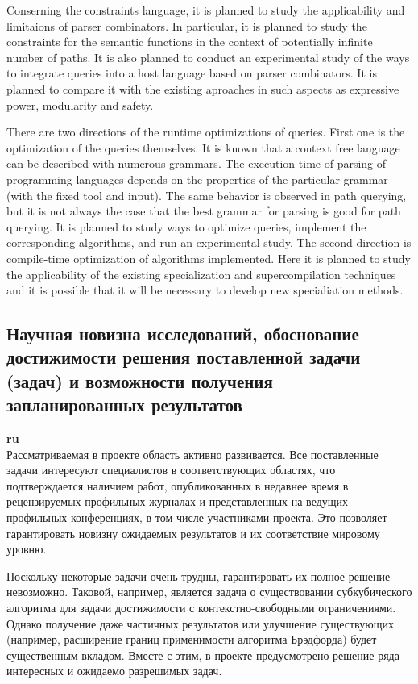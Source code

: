 \documentclass[12pt]{article}  %
\theoremstyle{remark}
\begin{document}
Conserning the constraints language, it is planned to study the applicability and limitaions of parser combinators. 
In particular, it is planned to study the constraints for the semantic functions in the context of potentially infinite number of paths. 
It is also planned to conduct an experimental study of the ways to integrate queries into a host language  based on parser combinators. 
It is planned to compare it with the existing aproaches in such aspects as expressive power, modularity and safety.

There are two directions of the runtime optimizations of queries. 
First one is the optimization of the queries themselves. 
It is known that a context free language can be described with numerous grammars. 
The execution time of parsing of programming languages depends on the properties of the particular grammar (with the fixed tool and input).
The same behavior is observed in path querying, but it is not always the case that the best grammar for parsing is good for path querying. 
It is planned to study ways to optimize queries, implement the corresponding algorithms, and run an experimental study. 
The second direction is compile-time optimization of algorithms implemented. 
Here it is planned to study the applicability of the existing specialization and supercompilation techniques and it is possible that it will be necessary to develop new specialiation methods. 


\subsection{Научная новизна исследований, обоснование достижимости решения поставленной задачи (задач) и возможности получения запланированных результатов}

\textbf{ru}\\
%
Рассматриваемая в проекте область активно развивается. Все поставленные задачи интересуют специалистов в соответствующих областях, что подтверждается наличием работ, опубликованных в недавнее время в рецензируемых профильных журналах и представленных на ведущих профильных конференциях, в том числе участниками проекта. Это позволяет гарантировать новизну ожидаемых результатов и их соответствие мировому уровню.

Поскольку некоторые задачи очень трудны, гарантировать их полное решение невозможно. Таковой, например, является задача о существовании субкубического алгоритма для задачи достижимости с контекстно-свободными ограничениями. Однако получение даже частичных результатов или улучшение существующих (например, расширение границ применимости алгоритма Брэдфорда) будет существенным вкладом. Вместе с этим, в проекте предусмотрено решение ряда интересных и ожидаемо разрешимых задач.
\end{document}
